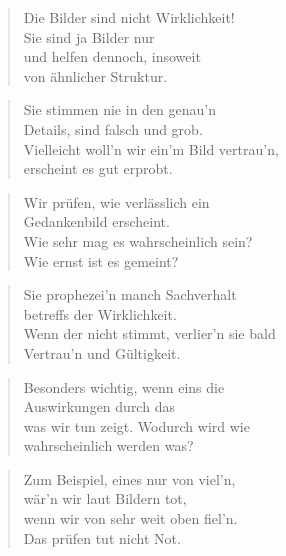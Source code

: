 \documentclass[10pt,a4paper]{article}
\begin{document}
\begin{multicols}{2}
\begin{verse}
Die Bilder sind nicht Wirklichkeit! \\
Sie sind ja Bilder nur \\
und helfen dennoch, insoweit \\
von ähnlicher Struktur. \\
\end{verse}

\begin{verse}
Sie stimmen nie in den genau’n \\
Details, sind falsch und grob. \\
Vielleicht woll’n wir ein’m Bild vertrau’n, \\
erscheint es gut erprobt. \\
\end{verse}

\begin{verse}
Wir prüfen, wie verlässlich ein \\
Gedankenbild erscheint. \\
Wie sehr mag es wahrscheinlich sein? \\
Wie ernst ist es gemeint? \\
\end{verse}

\begin{verse}
Sie prophezei’n manch Sachverhalt \\
betreffs der Wirklichkeit. \\
Wenn der nicht stimmt, verlier’n sie bald \\
Vertrau’n und Gültigkeit. \\
\end{verse}

\begin{verse}
Besonders wichtig, wenn eins die \\
Auswirkungen durch das \\
was wir tun zeigt. Wodurch wird wie \\
wahrscheinlich werden was? \\
\end{verse}

\begin{verse}
Zum Beispiel, eines nur von viel’n, \\
wär’n wir laut Bildern tot, \\
wenn wir von sehr weit oben fiel’n. \\
Das prüfen tut nicht Not. \\
\end{verse}


\end{multicols}
\end{document}
